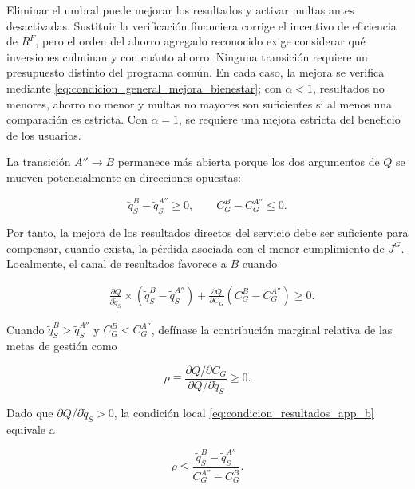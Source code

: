 Eliminar el umbral puede mejorar los resultados y activar multas antes desactivadas. Sustituir la verificación financiera corrige el incentivo de eficiencia de \(R^F\), pero el orden del ahorro agregado reconocido exige considerar qué inversiones culminan y con cuánto ahorro. Ninguna transición requiere un presupuesto distinto del programa común. En cada caso, la mejora se verifica mediante \eqref{eq:condicion_general_mejora_bienestar}; con \(\alpha<1\), resultados no menores, ahorro no menor y multas no mayores son suficientes si al menos una comparación es estricta. Con \(\alpha=1\), se requiere una mejora estricta del beneficio de los usuarios.

La transición \(A''\to B\) permanece más abierta porque los dos argumentos de \(Q\) se mueven potencialmente en direcciones opuestas:

\begin{equation}
\label{eq:canales_bienestar_app_b}
\widetilde q_S^{B}
-
\widetilde q_S^{A''}
\geq
0,
\qquad
C_G^{B}
-
C_G^{A''}
\leq
0.
\end{equation}

Por tanto, la mejora de los resultados directos del servicio debe ser suficiente para compensar, cuando exista, la pérdida asociada con el menor cumplimiento de \(J^G\). Localmente, el canal de resultados favorece a \(B\) cuando

\begin{equation}
\label{eq:condicion_resultados_app_b}
\begin{aligned}
&
\frac{\partial Q}{\partial \widetilde q_S}
\times
\left(
\widetilde q_S^{B}
-
\widetilde q_S^{A''}
\right)
+
\frac{\partial Q}{\partial C_G}
\left(
C_G^{B}
-
C_G^{A''}
\right)
\geq
0.
\end{aligned}
\end{equation}

Cuando \(\widetilde q_S^B>\widetilde q_S^{A''}\) y \(C_G^B<C_G^{A''}\), defínase la contribución marginal relativa de las metas de gestión como

\begin{equation}
\label{eq:rho_resultados_app_b}
\rho
\equiv
\frac{\partial Q/\partial C_G}
{\partial Q/\partial \widetilde q_S}
\geq
0.
\end{equation}

Dado que \(\partial Q/\partial\widetilde q_S>0\), la condición local \eqref{eq:condicion_resultados_app_b} equivale a

\begin{equation}
\label{eq:umbral_rho_app_b}
\rho
\leq
\frac{
\widetilde q_S^B-\widetilde q_S^{A''}
}{
C_G^{A''}-C_G^B
}.
\end{equation}


